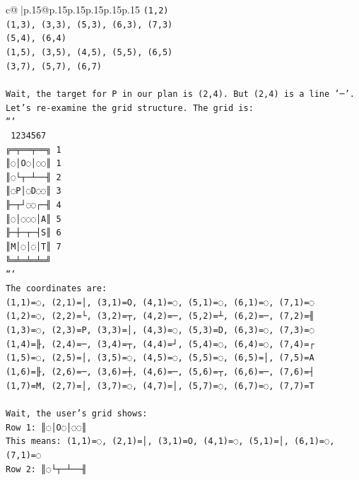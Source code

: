 \documentclass{article}
\begin{document}
{\begin{supertabular}{c@{$\;$}|p{.15\linewidth}@{}p{.15\linewidth}p{.15\linewidth}p{.15\linewidth}p{.15\linewidth}p{.15\linewidth}}
{{{\texttt{(1,2)} \\
\texttt{(1,3), (3,3), (5,3), (6,3), (7,3)} \\
\texttt{(5,4), (6,4)} \\
\texttt{(1,5), (3,5), (4,5), (5,5), (6,5)} \\
\texttt{(3,7), (5,7), (6,7)} \\
\\ 
\texttt{Wait, the target for P in our plan is (2,4). But (2,4) is a line '─'.} \\
\texttt{Let's re{-}examine the grid structure. The grid is:} \\
\texttt{```} \\
\texttt{ 1234567} \\
\texttt{╔═╤══╤══╗ 1} \\
\texttt{║◌│O◌│◌◌║ 1} \\
\texttt{║◌└┬─┴──╢ 2} \\
\texttt{║◌P│◌D◌◌║ 3} \\
\texttt{╟─┬┘◌◌┌─╢ 4} \\
\texttt{║◌│◌◌◌│A║ 5} \\
\texttt{╟─┼─┬─┤S║ 6} \\
\texttt{║M│◌│◌│T║ 7} \\
\texttt{╚═╧═╧═╧═╝} \\
\texttt{```} \\
\texttt{The coordinates are:} \\
\texttt{(1,1)=◌, (2,1)=│, (3,1)=O, (4,1)=◌, (5,1)=◌, (6,1)=◌, (7,1)=◌} \\
\texttt{(1,2)=◌, (2,2)=└, (3,2)=┬, (4,2)=─, (5,2)=┴, (6,2)=─, (7,2)=╢} \\
\texttt{(1,3)=◌, (2,3)=P, (3,3)=│, (4,3)=◌, (5,3)=D, (6,3)=◌, (7,3)=◌} \\
\texttt{(1,4)=╟, (2,4)=─, (3,4)=┬, (4,4)=┘, (5,4)=◌, (6,4)=◌, (7,4)=┌} \\
\texttt{(1,5)=◌, (2,5)=│, (3,5)=◌, (4,5)=◌, (5,5)=◌, (6,5)=│, (7,5)=A} \\
\texttt{(1,6)=╟, (2,6)=─, (3,6)=┼, (4,6)=─, (5,6)=┬, (6,6)=─, (7,6)=┤} \\
\texttt{(1,7)=M, (2,7)=│, (3,7)=◌, (4,7)=│, (5,7)=◌, (6,7)=◌, (7,7)=T} \\
\\ 
\texttt{Wait, the user's grid shows:} \\
\texttt{Row 1: ║◌│O◌│◌◌║} \\
\texttt{This means: (1,1)=◌, (2,1)=│, (3,1)=O, (4,1)=◌, (5,1)=│, (6,1)=◌, (7,1)=◌} \\
\texttt{Row 2: ║◌└┬─┴──╢} \\
}}}
\end{supertabular}}
\end{document}
